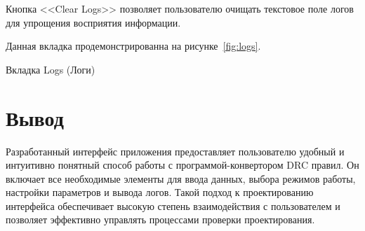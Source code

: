 Кнопка <<Clear Logs>> позволяет пользователю очищать текстовое
поле логов для упрощения восприятия информации.

Данная вкладка продемонстрированна на рисунке~\ref{fig:logs}.

\begin{image}
	\caption{Вкладка Logs (Логи)}
	\label{fig:logs}
\end{image}

\clearpage

\section*{\LARGE Вывод}

Разработанный интерфейс приложения предоставляет пользователю удобный
и интуитивно понятный способ работы с программой-конвертором DRC правил.
Он включает все необходимые элементы для ввода данных,
выбора режимов работы, настройки параметров и вывода логов.
Такой подход к проектированию интерфейса обеспечивает
высокую степень взаимодействия с пользователем
и позволяет эффективно управлять процессами проверки проектирования.



